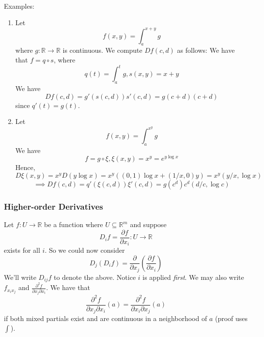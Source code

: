 \documentclass{article}
\newcommand{\reals}[0]{\mathbb{R}}
\newcommand{\prt}[2]{\frac{\partial #1}{\partial #2}}
\begin{document}
Examples:
\begin{enumerate}
  \item Let \begin{equation}f(x, y) = \int_a^{x + y}g\end{equation} where \(g: \reals \to \reals\) is continuous. We compute \(Df(c, d)\) as follows:
  We have that \(f = q \circ s\), where
  \begin{equation}q(t) = \int_a^tg, s(x, y) = x + y\end{equation}
  We have
  \begin{equation}Df(c, d) =  g'(s(c, d))s'(c, d) = g(c + d)(c + d)\end{equation}
  since \(q'(t) = g(t)\).

  \item Let \begin{equation}f(x, y) = \int_a^{x^y}g\end{equation} We have
  \begin{equation}f = g \circ \xi, \xi(x, y) = x^y = e^{y\log x}\end{equation}
  Hence,
  \begin{equation}D\xi(x, y) = x^yD(y\log x) = x^y((0, 1)\log x + (1/x, 0)y) = x^y(y/x, \log x)\end{equation}
  \begin{equation}\implies Df(c, d) = q'(\xi(c, d))\xi'(c, d) = g(c^d)c^d(d/c, \log c)\end{equation}
\end{enumerate}

\subsubsection{Higher-order Derivatives}
Let \(f: U \to \reals\) be a function where \(U \subseteq \reals^m\) and suppose
\begin{equation}D_if = \prt{f}{x_i}: U \to \reals\end{equation}
exists for all \(i\). So we could now consider
\begin{equation}D_j(D_if) = \prt{}{x_j}\left(\prt{f}{x_i}\right)\end{equation}
We'll write \(D_{ij}f\) to denote the above. Notice \(i\) is applied \textit{first}. We may also write \(f_{x_ix_j}\) and \(\frac{\partial^2 f}{\partial x_j \partial x_i}\). We have that
\begin{equation}\frac{\partial^2 f}{\partial x_j \partial x_i}(a) = \frac{\partial^2 f}{\partial x_i \partial x_j}(a)\end{equation}
if both mixed partials exist and are continuous in a neighborhood of \(a\) (proof uses \(\int\)).
\end{document}
